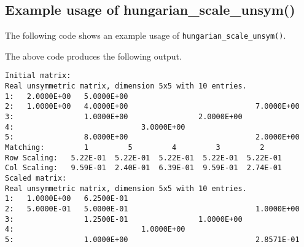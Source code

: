 \subsection{Example usage of hungarian\_scale\_unsym()}
The following code shows an example usage of \texttt{hungarian\_scale\_unsym()}.

The above code produces the following output.
\begin{verbatim}
Initial matrix:
Real unsymmetric matrix, dimension 5x5 with 10 entries.
1:   2.0000E+00   5.0000E+00                                       
2:   1.0000E+00   4.0000E+00                             7.0000E+00
3:                1.0000E+00                2.0000E+00             
4:                             3.0000E+00                          
5:                8.0000E+00                             2.0000E+00
Matching:         1         5         4         3         2
Row Scaling:   5.22E-01  5.22E-01  5.22E-01  5.22E-01  5.22E-01
Col Scaling:   9.59E-01  2.40E-01  6.39E-01  9.59E-01  2.74E-01
Scaled matrix:
Real unsymmetric matrix, dimension 5x5 with 10 entries.
1:   1.0000E+00   6.2500E-01                                       
2:   5.0000E-01   5.0000E-01                             1.0000E+00
3:                1.2500E-01                1.0000E+00             
4:                             1.0000E+00                          
5:                1.0000E+00                             2.8571E-01
\end{verbatim}
